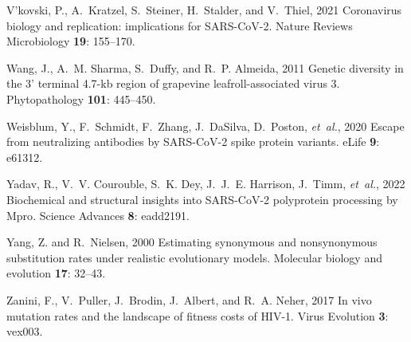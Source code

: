 \documentclass[9pt,twocolumn,twoside]{gsajnl_modified}
\begin{document}
{\begin{thebibliography}{76}
{V’kovski, P., A.~Kratzel, S.~Steiner, H.~Stalder, {\rm and} V.~Thiel}, 2021
  Coronavirus biology and replication: implications for {SARS-CoV-2}. Nature
  Reviews Microbiology {\bf 19}: 155--170.

{Wang, J., A.~M. Sharma, S.~Duffy, {\rm and} R.~P. Almeida}, 2011 Genetic
  diversity in the 3' terminal 4.7-kb region of grapevine leafroll-associated
  virus 3. Phytopathology {\bf 101}: 445--450.

{Weisblum, Y., F.~Schmidt, F.~Zhang, J.~DaSilva, D.~Poston, {\em et~al.\/}},
  2020 Escape from neutralizing antibodies by {SARS-CoV-2} spike protein
  variants. eLife {\bf 9}: e61312.

{Yadav, R., V.~V. Courouble, S.~K. Dey, J.~J.~E. Harrison, J.~Timm, {\em
  et~al.\/}}, 2022 {Biochemical and structural insights into SARS-CoV-2
  polyprotein processing by Mpro}. Science Advances {\bf 8}: eadd2191.

{Yang, Z. {\rm and} R.~Nielsen}, 2000 Estimating synonymous and nonsynonymous
  substitution rates under realistic evolutionary models. Molecular biology and
  evolution {\bf 17}: 32--43.

{Zanini, F., V.~Puller, J.~Brodin, J.~Albert, {\rm and} R.~A. Neher}, 2017 In
  vivo mutation rates and the landscape of fitness costs of {HIV}-1. Virus
  Evolution {\bf 3}: vex003.

\end{thebibliography}

}
\end{document}
